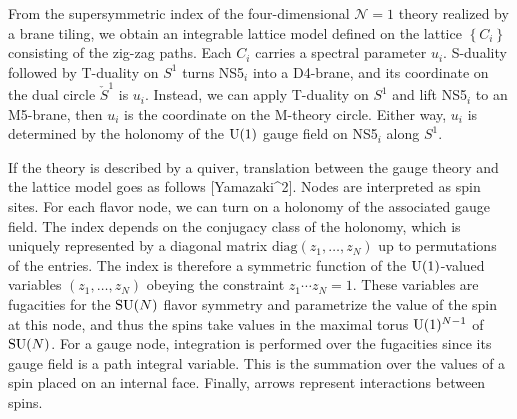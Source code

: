 From the supersymmetric index of the four-dimensional $\mathcal{N}=1$
theory realized by a brane tiling, we obtain an integrable lattice
model defined on the lattice $\left\{ C_{i}\right\} $ consisting
of the zig-zag paths. Each $C_{i}$ carries a spectral parameter $u_{i}$.
S-duality followed by T-duality on $S^{1}$ turns NS5$_{i}$ into
a D4-brane, and its coordinate on the dual circle $\check{S}^{1}$
is $u_{i}$. Instead, we can apply T-duality on $S^{1}$ and lift
NS5$_{i}$ to an M5-brane, then $u_{i}$ is the coordinate on the
M-theory circle. Either way, $u_{i}$ is determined by the holonomy
of the $\mathrm{U}(1)$ gauge field on NS5$_{i}$ along $S^{1}$. 

If the theory is described by a quiver, translation between the gauge
theory and the lattice model goes as follows {[}Yamazaki\textasciicircum 2{]}.
Nodes are interpreted as spin sites. For each flavor node, we can
turn on a holonomy of the associated gauge field. The index depends
on the conjugacy class of the holonomy, which is uniquely represented
by a diagonal matrix $\mathrm{diag}(z_{1},\ldots,z_{N})$ up to permutations
of the entries. The index is therefore a symmetric function of the
$\mathrm{U}(1)$-valued variables $(z_{1},\ldots,z_{N})$ obeying the constraint
$z_{1}\cdots z_{N}=1$. These variables are fugacities for the $\mathrm{SU}(N)$
flavor symmetry and parametrize the value of the spin at this node,
and thus the spins take values in the maximal torus $\mathrm{U}(1)^{N-1}$
of $\mathrm{SU}(N)$. For a gauge node, integration is performed over the fugacities
since its gauge field is a path integral variable. This is the summation
over the values of a spin placed on an internal face. Finally, arrows
represent interactions between spins. 

